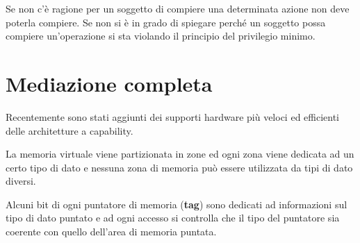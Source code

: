 Se non c'è ragione per un soggetto di compiere una determinata azione non deve poterla compiere. Se non si è in grado
di spiegare perché un soggetto possa compiere un'operazione si sta violando il principio del privilegio minimo.

\section{Mediazione completa}
Recentemente sono stati aggiunti dei supporti hardware più veloci ed efficienti delle architetture a capability.

La memoria virtuale viene partizionata in zone ed ogni zona viene dedicata ad un certo tipo di dato e nessuna zona
di memoria può essere utilizzata da tipi di dato diversi.

Alcuni bit di ogni puntatore di memoria (\textbf{tag}) sono dedicati ad informazioni sul tipo di dato puntato e ad
ogni accesso si controlla che il tipo del puntatore sia coerente con quello dell'area di memoria puntata.